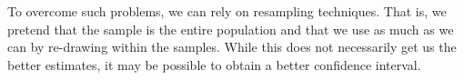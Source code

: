 \begin{mdframed}[backgroundcolor=yellow!5] 
\begin{comment}[Why is $I=J$?]
To show that expressions in $I$ and $J$ are equal, I define $L(\theta;x)=f(x;\theta)$ as a likelihood function. Notice that
\[
1=\int f(x;\theta)dx
\]
Firstly, differentiate with respect to $\theta$ to get
\begin{align*}
0&=\int\frac{\partial}{\partial\theta}f(x;\theta)dx\\
&=\int\frac{\partial}{\partial\theta}\log{f(x;\theta)}\times f(x;\theta)dx = E\left[\frac{\partial \log{f(x;\theta)}}{\partial\theta}\right]
\end{align*}
Differentiate above with respect to $\theta'$ to get
\begin{align*}
0&=\int\frac{\partial}{\partial\theta'}\left(\frac{\partial}{\partial\theta}\log{f(x;\theta)}\times f(x;\theta)\right)dx \\
&=\int\frac{\partial^2}{\partial\theta\partial\theta'}\log{f(x;\theta)}dx+\int\frac{\partial\log{f(x;\theta)}}{\partial\theta}\frac{\partial f(x;\theta)}{\partial\theta'}dx \\
&=\int\frac{\partial^2}{\partial\theta\partial\theta'}\log{f(x;\theta)}dx+\int\frac{\partial\log{f(x;\theta)}}{\partial\theta}\frac{\partial \log{f(x;\theta)}}{\partial\theta'}f(x;\theta)dx\\
&=E\left[\frac{\partial^2}{\partial\theta\partial\theta'}\log{f(x;\theta)}\right]+E\left[\frac{\partial}{\partial\theta}\log{f(x;\theta)}\cdot \frac{\partial}{\partial\theta'}\log{f(x;\theta)}\right]
\end{align*}
Take the first term on RHS of the last line to LHS, and we get $I=J$. (Hogg et al. (2014))
\end{comment}
\end{mdframed} 
To overcome such problems, we can rely on resampling techniques. That is, we pretend that the sample is the entire population and that we use as much as we can by re-drawing within the samples. While this does not necessarily get us the better estimates, it may be possible to obtain a better confidence interval. 
